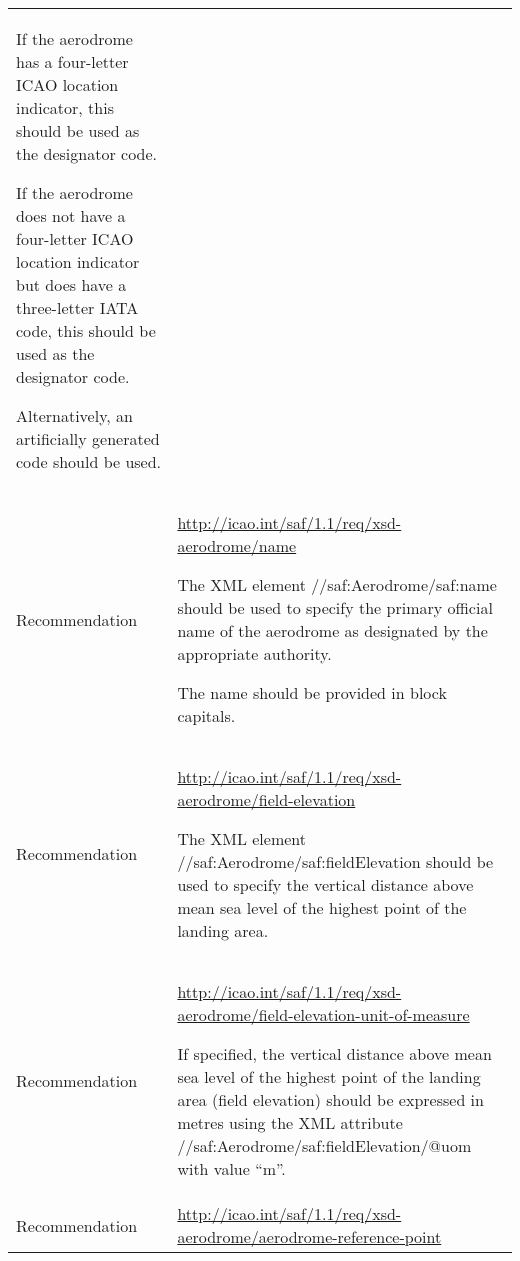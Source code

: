 \begin{longtable}[]{@{}ll@{}}
\begin{minipage}[t]{0.47\columnwidth}
If the aerodrome has a four-letter ICAO location indicator, this should be used as the designator code.

If the aerodrome does not have a four-letter ICAO location indicator but does have a three-letter IATA code, this should be used as the designator code.

Alternatively, an artificially generated code should be used.\strut
\end{minipage}\tabularnewline
\begin{minipage}[t]{0.47\columnwidth}\raggedright
Recommendation\strut
\end{minipage} & \begin{minipage}[t]{0.47\columnwidth}\raggedright
\url{http://icao.int/saf/1.1/req/xsd-aerodrome/name}

The XML element //saf:Aerodrome/saf:name should be used to specify the primary official name of the aerodrome as designated by the appropriate authority.

The name should be provided in block capitals.\strut
\end{minipage}\tabularnewline
\begin{minipage}[t]{0.47\columnwidth}\raggedright
Recommendation\strut
\end{minipage} & \begin{minipage}[t]{0.47\columnwidth}\raggedright
\url{http://icao.int/saf/1.1/req/xsd-aerodrome/field-elevation}

The XML element //saf:Aerodrome/saf:fieldElevation should be used to specify the vertical distance above mean sea level of the highest point of the landing area.\strut
\end{minipage}\tabularnewline
\begin{minipage}[t]{0.47\columnwidth}\raggedright
Recommendation\strut
\end{minipage} & \begin{minipage}[t]{0.47\columnwidth}\raggedright
\url{http://icao.int/saf/1.1/req/xsd-aerodrome/field-elevation-unit-of-measure}

If specified, the vertical distance above mean sea level of the highest point of the landing area (field elevation) should be expressed in metres using the XML attribute //saf:Aerodrome/saf:fieldElevation/@uom with value ``m''.\strut
\end{minipage}\tabularnewline
\begin{minipage}[t]{0.47\columnwidth}\raggedright
Recommendation\strut
\end{minipage} & \begin{minipage}[t]{0.47\columnwidth}\raggedright
\url{http://icao.int/saf/1.1/req/xsd-aerodrome/aerodrome-reference-point}


\end{minipage}
\end{longtable}
